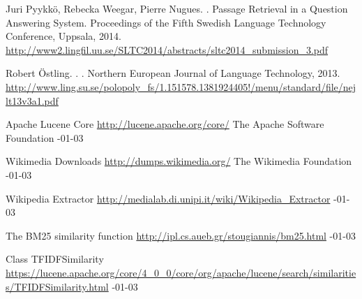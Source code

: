\documentclass[11pt,letterpaper]{article}
\begin{document}
\begin{thebibliography}{}

\iffalse
\bibitem[\protect\citename{Aho and Ullman}1972]{Aho:72}
Alfred~V. Aho and Jeffrey~D. Ullman.
\newblock 1972.
\newblock {\em The Theory of Parsing, Translation and Compiling}, volume~1.
\newblock Prentice-{Hall}, Englewood Cliffs, NJ.

\bibitem[\protect\citename{{American Psychological Association}}1983]{APA:83}
{American Psychological Association}.
\newblock 1983.
\newblock {\em Publications Manual}.
\newblock American Psychological Association, Washington, DC.

\bibitem[\protect\citename{{Association for Computing Machinery}}1983]{ACM:83}
{Association for Computing Machinery}.
\newblock 1983.
\newblock {\em Computing Reviews}, 24(11):503--512.

\bibitem[\protect\citename{Chandra \bgroup et al.\egroup }1981]{Chandra:81}
Ashok~K. Chandra, Dexter~C. Kozen, and Larry~J. Stockmeyer.
\newblock 1981.
\newblock Alternation.
\newblock {\em Journal of the Association for Computing Machinery},
  28(1):114--133.

\bibitem[\protect\citename{Gusfield}1997]{Gusfield:97}
Dan Gusfield.
\newblock 1997.
\newblock {\em Algorithms on Strings, Trees and Sequences}.
\newblock Cambridge University Press, Cambridge, UK.
\fi

Juri Pyykk\"o, Rebecka Weegar, Pierre Nugues.
.
\newblock Passage Retrieval in a Question Answering System. 
\newblock Proceedings of the Fifth Swedish Language Technology Conference, Uppsala, 2014.
\newblock \url{http://www2.lingfil.uu.se/SLTC2014/abstracts/sltc2014_submission_3.pdf}

Robert \"Ostling.
.
.
\newblock Northern European Journal of Language Technology, 2013.
\newblock \url{http://www.ling.su.se/polopoly_fs/1.151578.1381924405!/menu/standard/file/nejlt13v3a1.pdf}

\newblock Apache Lucene Core
\newblock \url{http://lucene.apache.org/core/}
\newblock The Apache Software Foundation
-01-03

\newblock Wikimedia Downloads
\newblock \url{http://dumps.wikimedia.org/}
\newblock The Wikimedia Foundation
-01-03

\newblock Wikipedia Extractor
\newblock \url{http://medialab.di.unipi.it/wiki/Wikipedia_Extractor}
-01-03

\newblock The BM25 similarity function
\newblock \url{http://ipl.cs.aueb.gr/stougiannis/bm25.html}
-01-03

\newblock Class TFIDFSimilarity
\newblock \url{https://lucene.apache.org/core/4_0_0/core/org/apache/lucene/search/similarities/TFIDFSimilarity.html}
-01-03

\end{thebibliography}
\end{document}
